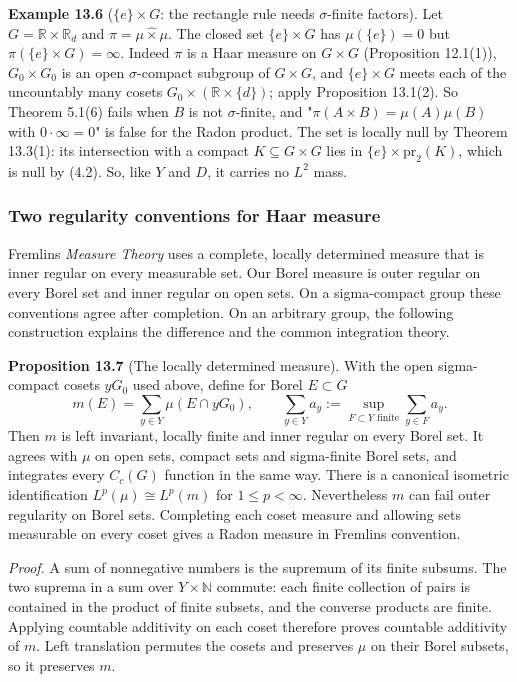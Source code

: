 \documentclass[
  english,
  11pt,
  a4paper,
]{article}
\begin{document}
\textbf{Example 13.6} (\(\{e\}\times G\): the rectangle rule needs
\(\sigma\)-finite factors). Let \(G=\mathbb R\times\mathbb R_d\) and
\(\pi=\mu\hat\times\mu\). The closed set \(\{e\}\times G\) has
\(\mu(\{e\})=0\) but \(\pi(\{e\}\times G)=\infty\). Indeed \(\pi\) is a
Haar measure on \(G\times G\) (Proposition 12.1(1)), \(G_0\times G_0\)
is an open \(\sigma\)-compact subgroup of \(G\times G\), and
\(\{e\}\times G\) meets each of the uncountably many cosets
\(G_0\times(\mathbb R\times\{d\})\); apply Proposition 13.1(2). So
Theorem 5.1(6) fails when \(B\) is not \(\sigma\)-finite, and
"\(\pi(A\times B)=\mu(A)\mu(B)\) with \(0\cdot\infty=0\)" is false for
the Radon product. The set is locally null by Theorem 13.3(1): its
intersection with a compact \(K\subseteq G\times G\) lies in
\(\{e\}\times\mathrm{pr}_2(K)\), which is null by (4.2). So, like \(Y\)
and \(D\), it carries no \(L^2\) mass.

\subsubsection{Two regularity conventions for Haar
measure}\label{haar-measure-on-locally-compact-groups--haar-measure-convention-bridge}

Fremlin\textquotesingle s \emph{Measure Theory} uses a complete, locally
determined measure that is inner regular on every measurable set. Our
Borel measure is outer regular on every Borel set and inner regular on
open sets. On a sigma-compact group these conventions agree after
completion. On an arbitrary group, the following construction explains
the difference and the common integration theory.

\textbf{Proposition 13.7} (The locally determined measure). With the
open sigma-compact cosets \(yG_0\) used above, define for Borel
\(E\subset G\) \[m(E)=\sum_{y\in Y}\mu(E\cap yG_0),
\qquad
\sum_{y\in Y}a_y:=\sup_{F\subset Y\text{ finite}}\sum_{y\in F}a_y.\]
Then \(m\) is left invariant, locally finite and inner regular on every
Borel set. It agrees with \(\mu\) on open sets, compact sets and
sigma-finite Borel sets, and integrates every \(C_c(G)\) function in the
same way. There is a canonical isometric identification
\(L^p(\mu)\cong L^p(m)\) for \(1\le p<\infty\). Nevertheless \(m\) can
fail outer regularity on Borel sets. Completing each coset measure and
allowing sets measurable on every coset gives a Radon measure in
Fremlin\textquotesingle s convention.

\emph{Proof.} A sum of nonnegative numbers is the supremum of its finite
subsums. The two suprema in a sum over \(Y\times\mathbb N\) commute:
each finite collection of pairs is contained in the product of finite
subsets, and the converse products are finite. Applying countable
additivity on each coset therefore proves countable additivity of \(m\).
Left translation permutes the cosets and preserves \(\mu\) on their
Borel subsets, so it preserves \(m\).
\end{document}
